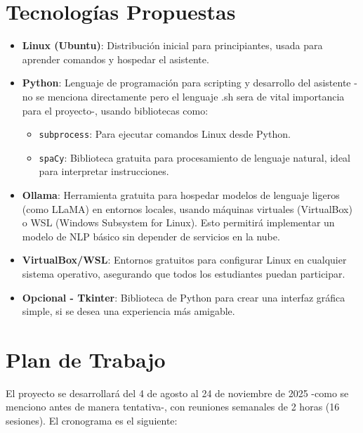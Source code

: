 \documentclass[conference, a4paper]{IEEEtran}
\begin{document}
\section{Tecnologías Propuestas}
\begin{itemize}
    \item \textbf{Linux (Ubuntu)}: Distribución inicial para principiantes, usada para aprender comandos y hospedar el asistente.
    \item \textbf{Python}: Lenguaje de programación para scripting y desarrollo del asistente -no se menciona directamente pero el lenguaje .sh
                           sera de vital importancia para el proyecto-, usando bibliotecas como:
        \begin{itemize}
            \item \texttt{subprocess}: Para ejecutar comandos Linux desde Python.
            \item \texttt{spaCy}: Biblioteca gratuita para procesamiento de lenguaje natural, ideal para interpretar instrucciones.
        \end{itemize}
    \item \textbf{Ollama}: Herramienta gratuita para hospedar modelos de lenguaje ligeros (como LLaMA) en entornos locales, usando máquinas virtuales
                           (VirtualBox) o WSL (Windows Subsystem for Linux). Esto permitirá implementar un modelo de NLP básico sin depender de 
                           servicios en la nube.
    \item \textbf{VirtualBox/WSL}: Entornos gratuitos para configurar Linux en cualquier sistema operativo, asegurando que todos los estudiantes
                                   puedan participar.
    \item \textbf{Opcional - Tkinter}: Biblioteca de Python para crear una interfaz gráfica simple, si se desea una experiencia más amigable.
\end{itemize}

\section{Plan de Trabajo}
El proyecto se desarrollará del 4 de agosto al 24 de noviembre de 2025 -como se menciono antes de manera tentativa-, con reuniones semanales de 2 
horas (16 sesiones). El cronograma es el siguiente:
\end{document}
